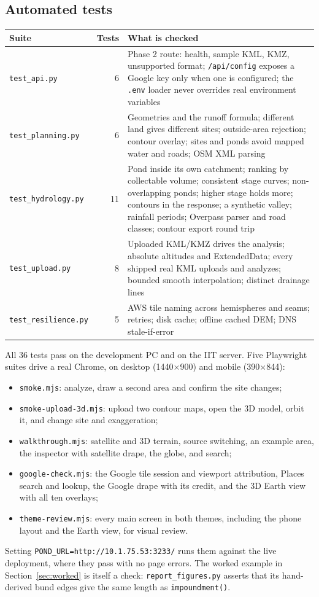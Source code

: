 \documentclass[11pt,a4paper]{article}
\newcommand{\code}[1]{\texttt{#1}}
\begin{document}
\subsection{Automated tests}
\begin{tabularx}{\linewidth}{@{}L{36mm}rY@{}}
\toprule
\textbf{Suite} & \textbf{Tests} & \textbf{What is checked}\\
\midrule
\code{test\_api.py} & 6 & Phase 2 route: health, sample KML, KMZ, unsupported format; \code{/api/config} exposes a Google key only when one is configured; the \code{.env} loader never overrides real environment variables\\
\code{test\_planning.py} & 6 & Geometries and the runoff formula; different land gives different sites; outside-area rejection; contour overlay; sites and ponds avoid mapped water and roads; OSM XML parsing\\
\code{test\_hydrology.py} & 11 & Pond inside its own catchment; ranking by collectable volume; consistent stage curves; non-overlapping ponds; higher stage holds more; contours in the response; a synthetic valley; rainfall periods; Overpass parser and road classes; contour export round trip\\
\code{test\_upload.py} & 8 & Uploaded KML/KMZ drives the analysis; absolute altitudes and ExtendedData; every shipped real KML uploads and analyzes; bounded smooth interpolation; distinct drainage lines\\
\code{test\_resilience.py} & 5 & AWS tile naming across hemispheres and seams; retries; disk cache; offline cached DEM; DNS stale-if-error\\
\bottomrule
\end{tabularx}

All 36 tests pass on the development PC and on the IIT server. Five Playwright suites drive a real Chrome, on desktop (1440$\times$900) and mobile (390$\times$844):
\begin{itemize}
\item \code{smoke.mjs}: analyze, draw a second area and confirm the site changes;
\item \code{smoke-upload-3d.mjs}: upload two contour maps, open the 3D model, orbit it, and change site and exaggeration;
\item \code{walkthrough.mjs}: satellite and 3D terrain, source switching, an example area, the inspector with satellite drape, the globe, and search;
\item \code{google-check.mjs}: the Google tile session and viewport attribution, Places search and lookup, the Google drape with its credit, and the 3D Earth view with all ten overlays;
\item \code{theme-review.mjs}: every main screen in both themes, including the phone layout and the Earth view, for visual review.
\end{itemize}
Setting \code{POND\_URL=http://10.1.75.53:3233/} runs them against the live deployment, where they pass with no page errors. The worked example in Section~\ref{sec:worked} is itself a check: \code{report\_figures.py} asserts that its hand-derived bund edges give the same length as \code{impoundment()}.
\end{document}
